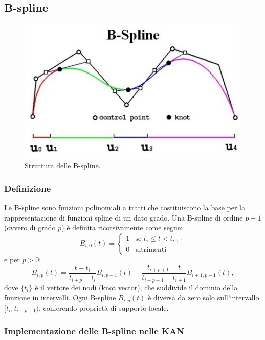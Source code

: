 \documentclass[a4paper,12pt]{report}
\begin{document}
	\subsection{B-spline}
	
	\begin{figure}[H]
		\centering
		\includegraphics[width=1.0\textwidth]{img/b_spline.jpg}
		\caption{Struttura delle B-spline.}
	\end{figure}
	
	\subsubsection{Definizione}
	Le B-spline sono funzioni polinomiali a tratti che costituiscono la base per la rappresentazione di funzioni spline di un dato grado. Una B-spline di ordine \(p+1\) (ovvero di grado \(p\)) è definita ricorsivamente come segue:
	\[
	B_{i,0}(t) = \begin{cases}
		1 & \text{se } t_i \leq t < t_{i+1} \\
		0 & \text{altrimenti}
	\end{cases}
	\]
	e per \(p > 0\):
	\[
	B_{i,p}(t) = \frac{t - t_i}{t_{i+p} - t_i} B_{i,p-1}(t) + \frac{t_{i+p+1} - t}{t_{i+p+1} - t_{i+1}} B_{i+1,p-1}(t),
	\]
	dove \(\{t_i\}\) è il vettore dei nodi (knot vector), che suddivide il dominio della funzione in intervalli. Ogni B-spline \(B_{i,p}(t)\) è diversa da zero solo sull'intervallo \([t_i, t_{i+p+1})\), conferendo proprietà di supporto locale.
	
	\subsubsection{Implementazione delle B-spline nelle KAN}
	
\end{document}
